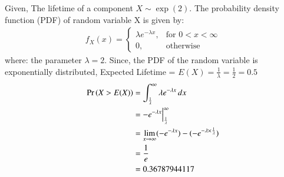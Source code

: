 
Given, The lifetime of a component $X \sim \exp(2)$. The probability density function (PDF) of random variable X is given by:
\begin{align}
  f_X(x) = 
  \begin{cases}
     \lambda e^{-\lambda x}, & \text{for } 0<x<\infty\\
    0, & \text{otherwise } 
  \end{cases}
\end{align}
where: the parameter $\lambda = 2$.
Since, the PDF of the random variable is exponentially distributed,
Expected Lifetime = $E(X)=\frac{1}{\lambda}=\frac{1}{2}=0.5$
\begin{align}
\Pr\left(X > E(X) \right) &= \int_{\frac{1}{\lambda}}^{\infty} \lambda e^{-\lambda x} \,dx\\
&= -e^{-\lambda x} \Bigr|_{\frac{1}{\lambda}}^{\infty} \\
&= \lim_{x \to \infty} (-e^{-\lambda x}) - (-e^{-\lambda\times \frac{1}{\lambda}})\\
&= \frac{1}{e}\\
&= 0.36787944117
\end{align}